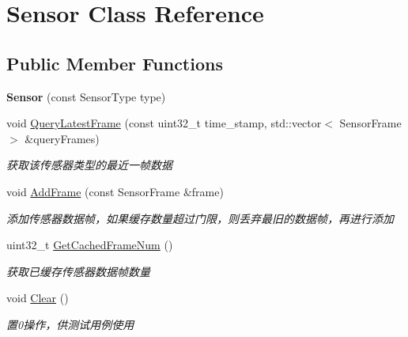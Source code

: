 \hypertarget{classSensor}{}\section{Sensor Class Reference}
\label{classSensor}
\subsection*{Public Member Functions}
\begin{DoxyCompactItemize}
\item 
\mbox{\label{classSensor_ae663763e1379dd380f2c1649035c46f0}} 
{\bfseries Sensor} (const Sensor\+Type type)
\item 
void \hyperlink{classSensor_aacdaea428253153f3be4bc556bf2f2a8}{Query\+Latest\+Frame} (const uint32\+\_\+t time\+\_\+stamp, std\+::vector$<$ Sensor\+Frame $>$ \&query\+Frames)
\begin{DoxyCompactList}\small\item\em 获取该传感器类型的最近一帧数据 \end{DoxyCompactList}\item 
void \hyperlink{classSensor_a98f98f2b0a623cfdbf689b6d20e3f1b9}{Add\+Frame} (const Sensor\+Frame \&frame)
\begin{DoxyCompactList}\small\item\em 添加传感器数据帧，如果缓存数量超过门限，则丢弃最旧的数据帧，再进行添加 \end{DoxyCompactList}\item 
uint32\+\_\+t \hyperlink{classSensor_a22fe10838de17d20cf6e7969b51b1dec}{Get\+Cached\+Frame\+Num} ()
\begin{DoxyCompactList}\small\item\em 获取已缓存传感器数据帧数量 \end{DoxyCompactList}\item 
\mbox{\label{classSensor_a1f3f419913dd059ffd729c0c5883f2b9}} 
void \hyperlink{classSensor_a1f3f419913dd059ffd729c0c5883f2b9}{Clear} ()
\begin{DoxyCompactList}\small\item\em 置0操作，供测试用例使用 \end{DoxyCompactList}\end{DoxyCompactItemize}
